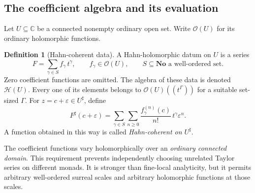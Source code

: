 \documentclass[11pt,letterpaper]{article}
\theoremstyle{definition}
\newtheorem{definition}[theorem]{Definition}
\theoremstyle{remark}
\newcommand{\No}{\mathbf{No}}
\newcommand{\C}{\mathbb C}
\newcommand{\OO}{\mathcal O}
\newcommand{\HH}{\mathcal H}
\newcommand{\sh}{^{\sharp}}
\numberwithin{equation}{section}
\begin{document}
\subsection{The coefficient algebra and its evaluation}
Let $U\subseteq\C$ be a connected nonempty ordinary open set. Write $\OO(U)$ for its ordinary holomorphic functions.
\begin{definition}[Hahn-coherent data]\label{def:coherent}
A Hahn-holomorphic datum on $U$ is a series
\begin{equation}\label{eq:coherent}
 F=\sum_{\gamma\in S} f_\gamma\,t^\gamma,
 \qquad f_\gamma\in\OO(U),
 \qquad S\subseteq\No\text{ a well-ordered set}.
\end{equation}
Zero coefficient functions are omitted. The algebra of these data is denoted $\HH(U)$. Every one of its elements belongs to $\OO(U)((t^\Gamma))$ for a suitable set-sized $\Gamma$.
For $z=c+\varepsilon\in U\sh$, define
\begin{equation}\label{eq:evaluation}
 F\sh(c+\varepsilon)
 =\sum_{\gamma\in S}\sum_{n\ge0}
       \frac{f_\gamma^{(n)}(c)}{n!}\,t^\gamma\varepsilon^n.
\end{equation}
A function obtained in this way is called \emph{Hahn-coherent on $U\sh$}.
\end{definition}
The coefficient functions vary holomorphically over an \emph{ordinary connected domain}. This requirement prevents independently choosing unrelated Taylor series on different monads. It is stronger than fine-local analyticity, but it permits arbitrary well-ordered surreal scales and arbitrary holomorphic functions at those scales.
\end{document}
